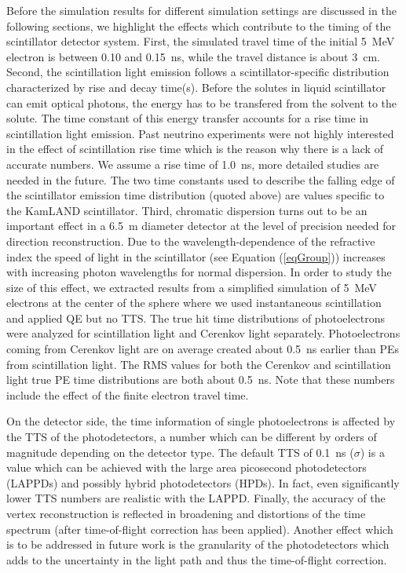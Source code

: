 \documentclass[aps,prc,twocolumn,groupedaddress,showpacs,amsmath,amssymb,floatfix,superscriptaddress]{revtex4}
\begin{document}
Before the simulation results for different simulation settings are discussed in the following sections, we highlight the effects which contribute to the timing of the scintillator detector system. First, the simulated travel time of the initial 5~MeV electron is between 0.10 and 0.15~ns, while the travel distance is about 3~cm. Second, the scintillation light emission follows a scintillator-specific distribution characterized by rise and decay time(s). Before the solutes in liquid scintillator can emit optical photons, the energy has to be transfered from the solvent to the solute. The time constant of this energy transfer accounts for a rise time in scintillation light emission. Past neutrino experiments were not highly interested in the effect of scintillation rise time which is the reason why there is a lack of accurate numbers. We assume a rise time of 1.0~ns, more detailed studies are needed in the future. The two time constants used to describe the falling edge of the scintillator emission time distribution (quoted above) are values specific to the KamLAND scintillator. Third, chromatic dispersion turns out to be an important effect in a 6.5~m diameter detector at the level of precision needed for direction reconstruction. Due to the wavelength-dependence of the refractive index the speed of light in the scintillator (see Equation (\ref{eqGroup})) increases with increasing photon wavelengths for normal dispersion. In order to study the size of this effect, we extracted results from a simplified simulation of 5~MeV electrons at the center of the sphere where we used instantaneous scintillation and applied QE but no TTS. The true hit time distributions of photoelectrons were analyzed for scintillation light and Cerenkov light separately. Photoelectrons coming from Cerenkov light are on average created about 0.5~ns earlier than PEs from scintillation light. The RMS values for both the Cerenkov and scintillation light true PE time distributions are both about 0.5~ns. Note that these numbers include the effect of the finite electron travel time.

On the detector side, the time information of single photoelectrons is affected by the TTS of the photodetectors, a number which can be different by orders of magnitude depending on the detector type. The default TTS of 0.1~ns ($\sigma$) is a value which can be achieved with the large area picosecond photodetectors (LAPPDs)\cite{LAPPDSum,LAPPDTDR} and possibly hybrid photodetectors (HPDs)\cite{hpdThesis}. In fact, even significantly lower TTS numbers are realistic with the LAPPD. Finally, the accuracy of the vertex reconstruction is reflected in broadening and distortions of the time spectrum (after time-of-flight correction has been applied). Another effect which is to be addressed in future work is the granularity of the photodetectors which adds to the uncertainty in the light path and thus the time-of-flight correction. 
\end{document}
